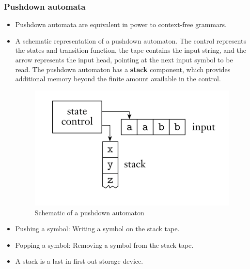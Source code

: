 \documentclass[11pt]{article}
\theoremstyle{definition}
\begin{document}
\subsubsection{Pushdown automata}
\begin{itemize}[leftmargin=*]
    \item Pushdown automata are equivalent in power to context-free grammars.
    \item A schematic representation of a pushdown automaton. The control represents the states and transition function, the tape contains the input string, and the arrow represents the input head, pointing at the next input symbol to be read. The pushdown automaton has a \textbf{stack} component, which provides additional memory beyond the finite amount available in the control.
    \begin{figure}[H]
    	\centering
    	\includegraphics[width=0.5\linewidth]{pda.png}
    	\caption{Schematic of a pushdown automaton}
    	\label{fig}
    \end{figure}
    \item Pushing a symbol: Writing a symbol on the stack tape.
    \item Popping a symbol: Removing a symbol from the stack tape.
    \item A stack is a last-in-first-out storage device.
\end{itemize}
\end{document}

